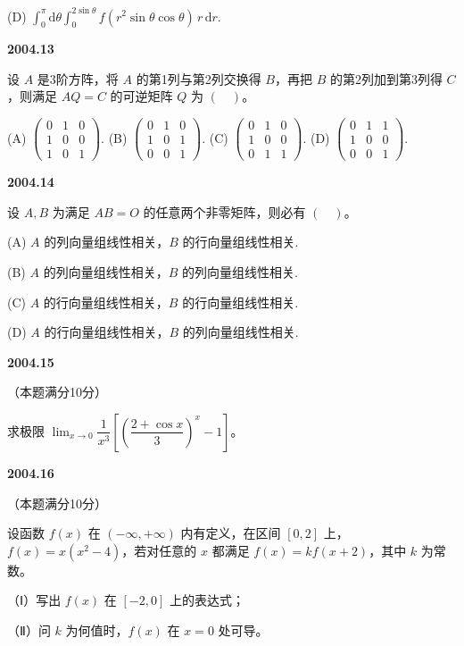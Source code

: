 \documentclass[UTF8,12pt,fontset=windows]{ctexart}
\begin{document}
(D) $\displaystyle\int_0^\pi\mathrm{d}\theta\int_0^{2\sin\theta}f(r^2\sin\theta\cos\theta)\,r\,\mathrm{d}r$.

\vfill
\newpage
{\large\bfseries 2004.13}

设 $A$ 是3阶方阵，将 $A$ 的第1列与第2列交换得 $B$，再把 $B$ 的第2列加到第3列得 $C$，则满足 $AQ=C$ 的可逆矩阵 $Q$ 为 $(\quad)$。

(A) $\begin{pmatrix}0&1&0\\1&0&0\\1&0&1\end{pmatrix}$.  (B) $\begin{pmatrix}0&1&0\\1&0&1\\0&0&1\end{pmatrix}$.  (C) $\begin{pmatrix}0&1&0\\1&0&0\\0&1&1\end{pmatrix}$.  (D) $\begin{pmatrix}0&1&1\\1&0&0\\0&0&1\end{pmatrix}$.

\vfill
\newpage
{\large\bfseries 2004.14}

设 $A,B$ 为满足 $AB=O$ 的任意两个非零矩阵，则必有 $(\quad)$。

(A) $A$ 的列向量组线性相关，$B$ 的行向量组线性相关.

(B) $A$ 的列向量组线性相关，$B$ 的列向量组线性相关.

(C) $A$ 的行向量组线性相关，$B$ 的行向量组线性相关.

(D) $A$ 的行向量组线性相关，$B$ 的列向量组线性相关.

\vfill
\newpage
{\large\bfseries 2004.15}

（本题满分10分）

求极限 $\lim_{x\to0}\dfrac{1}{x^3}\left[\left(\dfrac{2+\cos x}{3}\right)^x-1\right]$。

\vfill
\newpage
{\large\bfseries 2004.16}

（本题满分10分）

设函数 $f(x)$ 在 $(-\infty,+\infty)$ 内有定义，在区间 $[0,2]$ 上，$f(x)=x(x^2-4)$，若对任意的 $x$ 都满足 $f(x)=kf(x+2)$，其中 $k$ 为常数。

（Ⅰ）写出 $f(x)$ 在 $[-2,0]$ 上的表达式；

（Ⅱ）问 $k$ 为何值时，$f(x)$ 在 $x=0$ 处可导。
\end{document}
